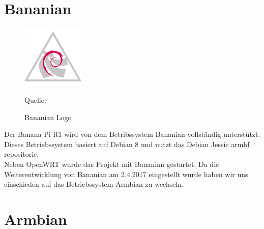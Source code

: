\section{Bananian}
\begin{figure}
\centering
\includegraphics[width=3cm]{pictures/Jakob/Bananian}
\caption{Bananian Logo}
Quelle: \cite{bananian1}
\end{figure}
Der Banana Pi R1 wird von dem Betribssystem Bananian vollständig unterstützt. Dieses Betriebssystem basiert auf Debian 8 und nutzt das Debian Jessie armhf repositorie. \cite{bananian}\\
Neben OpenWRT wurde das Projekt mit Bananian gestartet. Da die Weiterentwicklung von Bananian am 2.4.2017 eingestellt wurde haben wir uns einschieden auf das Betriebssystem Armbian zu wechseln. \cite{bananian2}








\section{Armbian}
